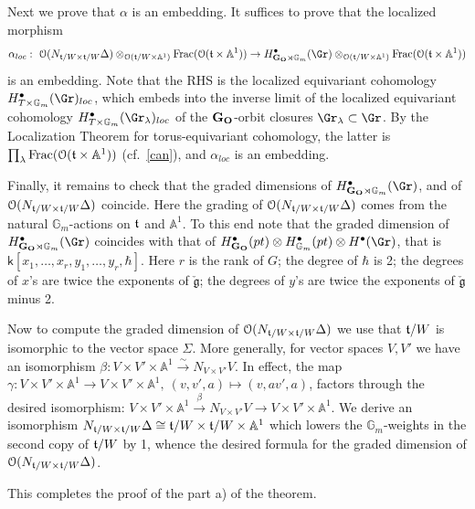 \documentclass[11pt]{amsart}
\theoremstyle{definition}
\theoremstyle{remark}
\renewcommand{\O}{{\mathcal O}}
\theoremstyle{remark}
\newcommand{\cal}{\mathcal}
\newcommand{\iso}{{\stackrel{\sim}{\longrightarrow}}}
\newcommand{\<}{\langle}
\renewcommand{\>}{\rangle}
\renewcommand{\t}{{\frak t}}
\newcommand{\Lg}{\check{\mathfrak g}{}}
\renewcommand{\O}{{\cal O}}
\newcommand{\GO}{{\bf G_O}}
\newcommand{\Aone}{{\mathbb A}^1}
\newcommand{\Gm}{{{\mathbb G}_m}}
\newcommand{\kk}{\mathsf k}
\begin{document}
Next we prove that $\alpha$ is an embedding. It suffices to prove that
the localized morphism $$\alpha_{loc}:\ 
\O(N_{\t/W\times \t/W}\Delta)\otimes_{\O(\t/W\times\Aone)}
\operatorname{Frac}(\O(\t\times\Aone))
\to H^\bullet_{\GO \rtimes \Gm}(\Gr)\otimes_{\O(\t/W\times\Aone)}
\operatorname{Frac}(\O(\t\times\Aone))$$ is an embedding. 
Note that the RHS is the 
localized equivariant cohomology $H^\bullet_{T\times\Gm}(\Gr)_{loc}$,
which embeds into the inverse limit of the localized equivariant cohomology
$H^\bullet_{T\times\Gm}(\Gr_\lambda)_{loc}$ of the $\GO$-orbit
closures $\Gr_\lambda\subset\Gr$.
By the Localization Theorem for torus-equivariant cohomology,
the latter is $\prod_\lambda\operatorname{Frac}(\O(\t\times\Aone))$
(cf.~\ref{can}), and $\alpha_{loc}$ is an embedding.

Finally, it remains to check that the graded dimensions of
$H^\bullet_{\GO \rtimes \Gm}(\Gr)$, and of
$\O(N_{\t/W\times \t/W}\Delta)$ coincide. Here the grading of
$\O(N_{\t/W\times \t/W}\Delta)$ comes from the natural $\Gm$-actions on
$\t$ and $\Aone$. To this end note that the graded dimension of 
$H^\bullet_{\GO \rtimes \Gm}(\Gr)$ coincides with that of
$H^\bullet_\GO(pt)\otimes H^\bullet_\Gm(pt)\otimes H^\bullet(\Gr)$,
that is $\kk[x_1,\ldots,x_r,y_1,\ldots,y_r,\hbar]$. Here $r$ is the rank of
$G$; the degree of $\hbar$ is 2; the degrees of $x$'s are twice the 
exponents of $\Lg$; the degrees of $y$'s are twice the exponents of
$\Lg$ minus 2.

Now to compute the graded dimension of $\O(N_{\t/W\times \t/W}\Delta)$ we
use that $\t/W$ is isomorphic to the vector space $\Sigma$. More generally,
for vector spaces $V,V'$ we have an isomorphism 
$\beta: V\times V'\times\Aone\iso N_{V\times V'}V$. In effect, the map
$\gamma: V\times V'\times\Aone\to V\times V'\times\Aone,\
(v,v',a)\mapsto(v,av',a)$, factors through the desired isomorphism:
$V\times V'\times\Aone\overset{\beta}{\to}N_{V\times V'}V\to 
V\times V'\times\Aone$. We derive an isomorphism 
$N_{\t/W\times\t/W}\Delta\cong\t/W\times\t/W\times\Aone$
which lowers the $\Gm$-weights in the second copy of $\t/W$ by 1, 
whence the desired formula for the graded
dimension of $\O(N_{\t/W\times\t/W}\Delta)$.


This completes the proof of the part a) of the theorem.
\end{document}
